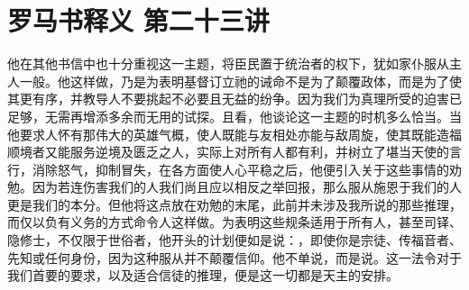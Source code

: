 
\section{罗马书释义 第二十三讲}

\par

\par

他在其他书信中也十分重视这一主题，将臣民置于统治者的权下，犹如家仆服从主人一般。他这样做，乃是为表明基督订立祂的诫命不是为了颠覆政体，而是为了使其更有序，并教导人不要挑起不必要且无益的纷争。因为我们为真理所受的迫害已足够，无需再增添多余而无用的试探。且看，他谈论这一主题的时机多么恰当。当他要求人怀有那伟大的英雄气概，使人既能与友相处亦能与敌周旋，使其既能造福顺境者又能服务逆境及匮乏之人，实际上对所有人都有利，并树立了堪当天使的言行，消除怒气，抑制冒失，在各方面使人心平稳之后，他便引入关于这些事情的劝勉。因为若连伤害我们的人我们尚且应以相反之举回报，那么服从施恩于我们的人更是我们的本分。但他将这点放在劝勉的末尾，此前并未涉及我所说的那些推理，而仅以负有义务的方式命令人这样做。为表明这些规条适用于所有人，甚至司铎、隐修士，不仅限于世俗者，他开头的计划便如是说：，即使你是宗徒、传福音者、先知或任何身份，因为这种服从并不颠覆信仰。他不单说，而是说。这一法令对于我们首要的要求，以及适合信徒的推理，便是这一切都是天主的安排。\par

